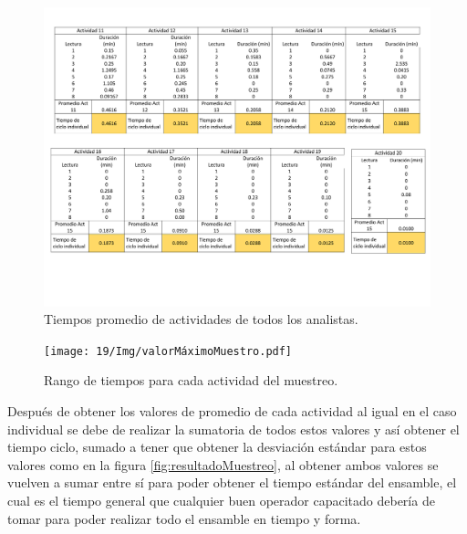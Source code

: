         \begin{figure}[H]
        \centering
        \includegraphics[trim = {1mm 37mm 1mm 1mm},clip,scale=0.25]{19/Img/tiemposMuestreo2.pdf}
        \newpage
        \caption{Tiempos promedio de actividades de todos los analistas.}
        \label{fig:tiemposMuestreo2 }    
    \end{figure}
    \begin{figure}[H]
        \centering
        \texttt{[image: 19/Img/valorMáximoMuestro.pdf]}
        \newpage
        \caption{Rango de tiempos para cada actividad del muestreo.}
        \label{fig:valorMáximoMuestro}    
    \end{figure}
    Después de obtener los valores de promedio de cada actividad al igual en el caso individual se debe de realizar la sumatoria de todos estos valores y así obtener el tiempo ciclo, sumado a tener que obtener la desviación estándar para estos valores como en la figura \ref{fig:resultadoMuestreo}, al obtener ambos valores se vuelven a sumar entre sí para poder obtener el tiempo estándar del ensamble, el cual es el tiempo general que cualquier buen operador capacitado debería de tomar para poder realizar todo el ensamble en tiempo y forma.
